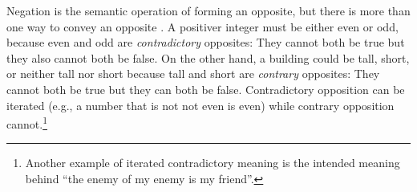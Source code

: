 \documentclass[floatsintext,doc]{apa6}
\let\rmarkdownfootnote\footnote%
\def\footnote{\protect\rmarkdownfootnote}
\begin{document}
Negation is the semantic operation of forming an opposite, but there is more than one way to convey an opposite \cite{Horn1989:Natural}. 
A positiver integer must be either even or odd, because even and odd are \emph{contradictory} opposites: They cannot both be true but they also cannot both be false. 
On the other hand, a building could be tall, short, or neither tall nor short because tall and short are \emph{contrary} opposites: They cannot both be true but they can both be false. 
Contradictory opposition can be iterated (e.g., a number that is not not even is even) while contrary opposition cannot.\footnote{
Another example of iterated contradictory meaning is the intended meaning behind ``the enemy of my enemy is my friend''.
} 
\end{document}
